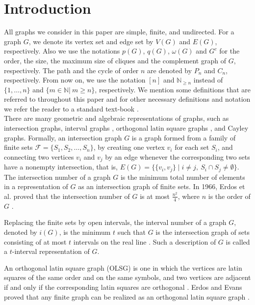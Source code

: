 \documentclass[11pt,letterpaper]{article}
\begin{document}
{\section{Introduction}
All graphs we consider in this paper are simple, finite, and undirected. For a graph $G$, we denote its vertex set and edge set by $V(G)$ and $E(G)$, respectively. Also we use the notations $p(G)$, $q(G)$, $\omega(G)$ and $G^c$ for the order, the size, the maximum size of cliques and the complement graph of $G$, respectively. The path and the cycle of order $n$ are denoted by $P_n$ and $C_n$, respectively. From now on,  we use the notation $[n]$ and $\mathbb{N}_{\geq n}$ instead of $\{1,\ldots,n\}$ and $\{m\in\mathbb{N}|\ m\geq n\}$, respectively. We mention some definitions that are referred to throughout this paper and for other necessary definitions and notation we refer the reader to a standard text-book \cite{bondy}.\\
There are many geometric and algebraic representations of graphs, such as intersection graphs, interval graphs \cite{trotter1979double}, orthogonal latin square graphs \cite{lindner1979orthogonal}, and Cayley graphs. Formally, an intersection graph $G$ is a graph formed from a family of finite sets $\mathcal{F}=\{S_1, S_2,\ldots, S_n\}$, by creating one vertex $v_i$ for each set $S_i$, and connecting two vertices $v_i$ and $v_j$ by an edge whenever the corresponding two sets have a nonempty intersection, that is, $E(G)=\{\{v_i,v_j\}\mid i\neq j,\ S_{i}\cap S_{j}\neq\emptyset \}$.  The intersection number of a graph $G$ is the minimum total number of elements in a representation of $G$ as an intersection graph of finite sets. 
In 1966, Erdos et al. proved that the intersection number of $G$ is at most $\frac{n^2}{4}$, where $n$ is the order of $G$ \cite{erdos1966}.

Replacing the finite sets by open intervals, the interval number of a graph $G$, denoted by $i(G)$, is the minimum $t$ such that $G$ is the intersection graph of sets consisting of at most $t$ intervals on the real line \cite{trotter1979double}. Such a description of $G$ is called a $t$-interval representation of $G$.

An orthogonal latin square graph (OLSG) is one in which the vertices are latin squares of the same order and on the same symbols, and two vertices are adjacent if and only if the corresponding latin squares are orthogonal \cite{lindner1979orthogonal}. Erdos and Evans proved that any finite graph can be realized as an orthogonal latin square graph \cite{erdos1989representations}. 

}
\end{document}
